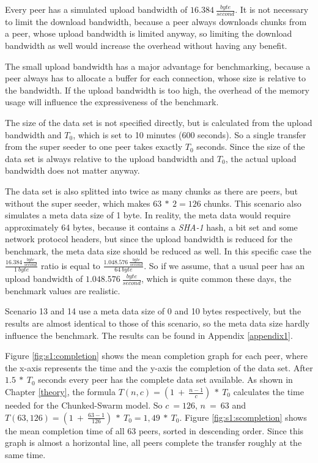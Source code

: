 Every peer has a simulated upload bandwidth of $16.384\:\frac{byte}{second}$. It is not necessary to limit the download bandwidth, because a peer always downloads chunks from a peer, whose upload bandwidth is limited anyway, so limiting the download bandwidth as well would increase the overhead without having any benefit. 

The small upload bandwidth has a major advantage for benchmarking, because a peer always has to allocate a buffer for each connection, whose size is relative to the bandwidth. If the upload bandwidth is too high, the overhead of the memory usage will influence the expressiveness of the benchmark.

The size of the data set is not specified directly, but is calculated from the upload bandwidth and $T_0$, which is set to 10 minutes (600 seconds). So a single transfer from the super seeder to one peer takes exactly $T_0$ seconds. Since the size of the data set is always relative to the upload bandwidth and $T_0$, the actual upload bandwidth does not matter anyway. 

The data set is also splitted into twice as many chunks as there are peers, but without the super seeder, which makes $63\:*\:2=126$ chunks. This scenario also simulates a meta data size of 1 byte. In reality, the meta data would require approximately 64 bytes, because it contains a \emph{SHA-1} hash, a bit set and some network protocol headers, but since the upload bandwidth is reduced for the benchmark, the meta data size should be reduced as well. In this specific case the $\frac{16.384\:\frac{byte}{second}}{1\:byte}$ ratio is equal to $\frac{1.048.576\:\frac{byte}{second}}{64\:byte}$. So if we assume, that a usual peer has an upload bandwidth of $1.048.576\:\frac{byte}{second}$, which is quite common these days, the benchmark values are realistic.

Scenario 13 and 14 use a meta data size of 0 and 10 bytes respectively, but the results are almost identical to those of this scenario, so the meta data size hardly influence the benchmark. The results can be found in Appendix \ref{appendix1}.

Figure \ref{fig:s1:completion} shows the mean completion graph for each peer, where the x-axis represents the time and the y-axis the completion of the data set. After $1.5\:*\:T_0$ seconds every peer has the complete data set available. As shown in Chapter \ref{theory}, the formula $T(n, c) = (1\:+\:\frac{n-1}{c})\:*\:T_0$ calculates the time needed for the Chunked-Swarm model. So $c\:=126$, $n\:=\:63$ and $T(63, 126) = (1\:+\:\frac{63-1}{126})\:*\:T_0 = 1,49\:*\:T_0$. Figure \ref{fig:s1:scompletion} shows the mean completion time of all 63 peers, sorted in descending order. Since this graph is almost a horizontal line, all peers complete the transfer roughly at the same time.


